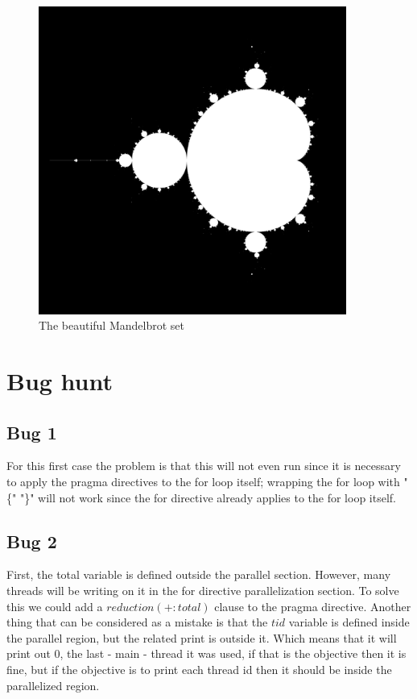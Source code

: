 \documentclass[unicode,11pt,a4paper,oneside,numbers=endperiod,openany]{scrartcl}
\begin{document}
\begin{figure}[H]
    \centering
    \includegraphics[width=0.9\textwidth]{./img/exe2/mandel.png}
    \caption{The beautiful Mandelbrot set}
\end{figure}

\section{Bug hunt }
\subsection{Bug 1}
For this first case the problem is that 
this will not even run since it is necessary to apply the pragma directives to the for loop itself;
wrapping the for loop with "\{" "\}" will not work since the for directive already applies to the for
loop itself. 
\subsection{Bug 2}
First, the total variable is defined outside the parallel section. However, many threads 
will be writing on it in the for directive parallelization section. To solve this we could add a
$reduction(+:total)$ clause to the pragma directive.
Another thing that can be considered as a mistake is that the $tid$ variable is defined inside the parallel
region, but the related print is outside it. Which means that it will print out 0, the last - main -  thread it was used, if that
is the objective then it is fine, but if the objective is to print each thread id then it should be inside the parallelized region.
\end{document}

